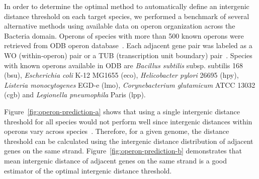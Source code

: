 In order to determine the optimal method to automatically define an intergenic
distance threshold on each target species, we performed a benchmark of several
alternative methods using available data on operon organization across the
Bacteria domain. Operons of species with more than 500 known operons were
retrieved from ODB operon database~\citep{okuda2006odb}. Each adjacent gene pair
was labeled as a WO (within-operon) pair or a TUB (transcription unit boundary)
pair~\citep{chen2004computational}. Species with known operons available in ODB
are \textit{Bacillus subtilis} subsp. subtilis 168 (bsu), \textit{Escherichia
  coli} K-12 MG1655 (eco), \textit{Helicobacter pylori} 26695 (hpy),
\textit{Listeria monocytogenes} EGD-e (lmo), \textit{Corynebacterium
  glutamicum} ATCC 13032 (cgb) and \textit{Legionella pneumophila} Paris (lpp).

Figure~\ref{fig:operon-prediction-a} shows that using a single intergenic
distance threshold for all species would not perform well since intergenic
distances within operons vary across
species~\citep{rogozin2002congruent}. Therefore, for a given genome, the
distance threshold can be calculated using the intergenic distance distribution
of adjacent genes on the same strand. Figure~\ref{fig:operon-prediction-b}
demonstrates that mean intergenic distance of adjacent genes on the same strand
is a good estimator of the optimal intergenic distance threshold.

